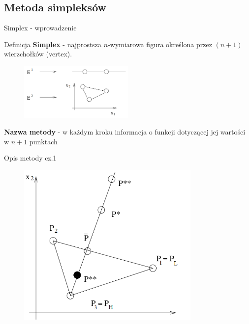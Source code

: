 \subsection{Metoda simpleksów}

  \begin{frame}{Simplex - wprowadzenie}

    \begin{block}{Definicja}
 	  \textbf{Simplex} - najprostsza $n$-wymiarowa figura określona przez $(n+1)$ wierzchołków (vertex).
  	\end{block}
  	\begin{figure}
		\centering
		\includegraphics[height=0.3\textheight ,width=0.5\textwidth]{img/17/simplex}
	\end{figure}
  	\begin{block}{}
 	  \textbf{Nazwa metody} - w każdym kroku informacja o funkcji dotyczącej jej wartości w $n+1$ punktach
  	\end{block}

  \end{frame}

  \begin{frame}{Opis metody cz.1}

  	\begin{figure}
		\centering
		\includegraphics[height=0.8\textheight ,width=0.8\textwidth]{img/17/simplex_method}
	\end{figure}

  \end{frame}


